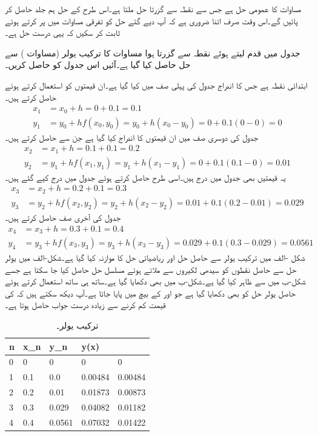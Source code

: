 مساوات  کا عمومی حل  ہے جس سے  نقطہ  سے گزرتا حل  ملتا ہے۔اس طرح کے حل ہم جلد حاصل کر پائیں گے۔اس وقت صرف اتنا ضروری ہے کہ  آپ دیے گئے حل کو تفرقی مساوات میں پر کرتے ہوئے ثابت کر سکیں کہ یہی درست حل ہے۔

جدول  میں قدم  لیتے ہوئے نقطہ  سے گزرتا ہوا  مساوات  کا ترکیب یولر (مساوات ) سے حل حاصل کیا گیا ہے۔آئیں اس جدول کو حاصل کریں۔

ابتدائی نقطہ  ہے جس کا اندراج جدول  کی پہلی صف میں کیا گیا ہے۔ان قیمتوں کو استعمال کرتے ہوئے  حاصل کرتے ہیں۔
\begin{align*}
x_1&=x_0+h=0+0.1=0.1\\
y_1&=y_0+h f(x_0,y_0)=y_0+h(x_0-y_0)=0+0.1(0-0)=0
\end{align*}
جدول  کی دوسری صف میں ان قیمتوں کا اندراج کیا گیا ہے جن سے  حاصل کرتے ہیں۔
\begin{align*}
x_2&=x_1+h=0.1+0.1=0.2\\
y_2&=y_1+h f(x_1,y_1)=y_1+h(x_1-y_1)=0+0.1(0.1-0)=0.01
\end{align*}
یہ قیمتیں بھی جدول میں درج ہیں۔اسی طرح  حاصل کرتے ہوئے جدول میں درج کیے گئے ہیں۔
\begin{align*}
x_3&=x_2+h=0.2+0.1=0.3\\
y_3&=y_2+h f(x_2,y_2)=y_2+h(x_2-y_2)=0.01+0.1(0.2-0.01)=0.029
\end{align*}
جدول کی آخری صف حاصل کرتے ہیں۔
\begin{align*}
x_4&=x_3+h=0.3+0.1=0.4\\
y_4&=y_3+h f(x_3,y_3)=y_3+h(x_3-y_3)=0.029+0.1(0.3-0.029)=0.0561
\end{align*}
شکل -الف میں ترکیب یولر سے حاصل حل اور ریاضیاتی حل  کا موازنہ کیا گیا ہے۔شکل-الف میں یولر حل سے حاصل نقطوں کو سیدھی لکیروں سے ملاتے ہوئے مسلسل حل حاصل کیا جا سکتا ہے جسے شکل-ب میں  سے ظاہر کیا گیا ہے۔شکل-ب میں  بھی دکھایا گیا ہے۔ساتھ ہی ساتھ  استعمال کرتے ہوئے حاصل یولر حل کو بھی دکھایا گیا ہے جو  اور  کے بیچ میں پایا جاتا ہے۔آپ دیکھ سکتے ہیں کہ  کی قیمت کم کرنے سے زیادہ درست جواب حاصل ہوتا ہے۔ 
\begin{table}
\caption{ترکیب یولر۔}
\label{جدول_اول_سادہ_یولر_الف}
\centering
\begin{tabular}{LLLLL}
n&x_n&y_n&y(x)&\\
&0&0&0&0\\
1&0.1&0.0&0.00484&0.00484\\
2&0.2&0.01&0.01873&0.00873\\
3&0.3&0.029&0.04082&0.01182\\
4&0.4&0.0561&0.07032&0.01422
\end{tabular}
\end{table}
